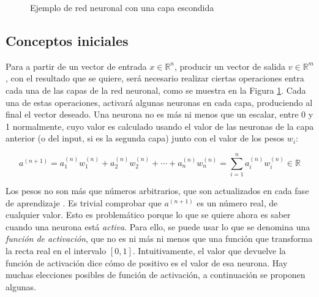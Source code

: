 \begin{figure}[H]
    \centering
    \caption{Ejemplo de red neuronal con una capa escondida}
    \label{redneuronal:1}
\end{figure}

\subsection{Conceptos iniciales}

Para a partir de un vector de entrada $x\in\mathbb{R}^n$, producir un vector de salida $v\in\mathbb{R}^m$,
con el resultado que se quiere, será necesario realizar ciertas operaciones entra cada una de las capas
de la red neuronal, como se muestra en la Figura \ref{redneuronal:1}. Cada una de estas operaciones, activará
algunas neuronas en cada capa, produciendo al final el vector deseado. Una neurona no es más ni menos
que un escalar, entre 0 y 1 normalmente, cuyo valor es calculado usando el valor de las neuronas de la
capa anterior (o del input, si es la segunda capa) junto con el valor de los pesos $w_i$:

\[
    a^{(n+1)} = a^{(n)}_1w^{(n)}_1+a^{(n)}_2w^{(n)}_2+\cdots+a^{(n)}_nw^{(n)}_n=\sum_{i=1}^na^{(n)}_iw^{(n)}_i\in\mathbb{R}
\]

Los pesos no son más que números arbitrarios, que son actualizados en cada fase de aprendizaje \cite{rumelhart1986learning}.
Es trivial comprobar que $a^{(n+1)}$ es un número real, de cualquier valor. Esto es problemático porque
lo que se quiere ahora es saber cuando una neurona está \textit{activa}. Para ello, se puede usar lo
que se denomina una \textit{función de activación}, que no es ni más ni menos que una función  que transforma
la recta real en el intervalo $[0,1]$. Intuitivamente, el valor que devuelve la función de activación dice
cómo de positivo es el valor de esa neurona. Hay muchas elecciones posibles de función de activación, a continuación
se proponen algunas.

